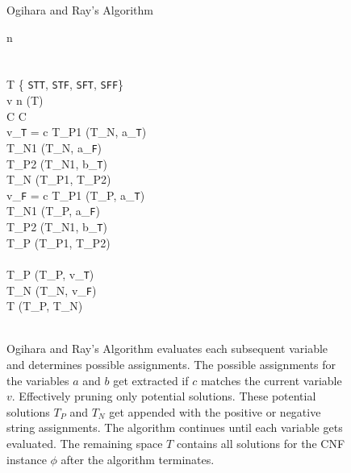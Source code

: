 
\begin{figure}[htbp]
\begin{center}

	\begin{pseudocode}{Ogihara and Ray's Algorithm}{\phi}
	
	n  \phi \\
	\\
	\\
	T \GETS \{ \texttt{STT}, \texttt{STF}, \texttt{SFT},  \texttt{SFF}\} \\
	
	\FOR v   n \DO
		\BEGIN
		[T_P, T_N] \GETS {}(T)\\
	
		\FOREACH {} C  \phi \DO
			\BEGIN
				[a, b, c] \GETS C\\
				\IF v_{\texttt{T}} = c  \THEN
					\BEGIN
						T_{P1} \GETS {}(T_N, a_{\texttt{T}})\\
						T_{N1} \GETS {}(T_N, a_{\texttt{F}})\\				
						T_{P2} \GETS {}(T_{N1}, b_{\texttt{T}})\\
						T_{N} \GETS {}(T_{P1}, T_{P2})
					\END \\  
				\IF v_{\texttt{F}} = c \THEN
					\BEGIN
						T_{P1} \GETS {}(T_P, a_{\texttt{T}})\\
						T_{N1} \GETS {}(T_P, a_{\texttt{F}})\\				
						T_{P2} \GETS {}(T_{N1}, b_{\texttt{T}})\\
						T_{P} \GETS {}(T_{P1}, T_{P2})
					\END\\
			\END\\
			T_P \GETS {}(T_P, v_{\texttt{T}})\\
			T_N \GETS {}(T_N, v_{\texttt{F}})\\
			T \GETS {}(T_P, T_N)\\
		\END\\
	\end{pseudocode}

\caption{{\sc Ogihara and Ray's Algorithm} evaluates each subsequent variable and determines possible assignments.  The possible assignments for the variables $a$ and $b$ get extracted if $c$ matches the current variable $v$.  Effectively pruning only potential solutions.  These potential solutions $T_P$ and $T_N$ get appended with the positive or negative string assignments.  The algorithm continues until each variable gets evaluated.  The remaining space $T$ contains all solutions for the CNF instance $\phi$ after the algorithm terminates.}
\label{ogiharaRayAlgorithm}
\end{center}
\end{figure}

